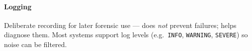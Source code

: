 \paragraph{Logging} Deliberate recording for later forensic use — does \emph{not} prevent failures; helps diagnose them. Most systems support log levels (e.g.\ \texttt{INFO}, \texttt{WARNING}, \texttt{SEVERE}) so noise can be filtered.

